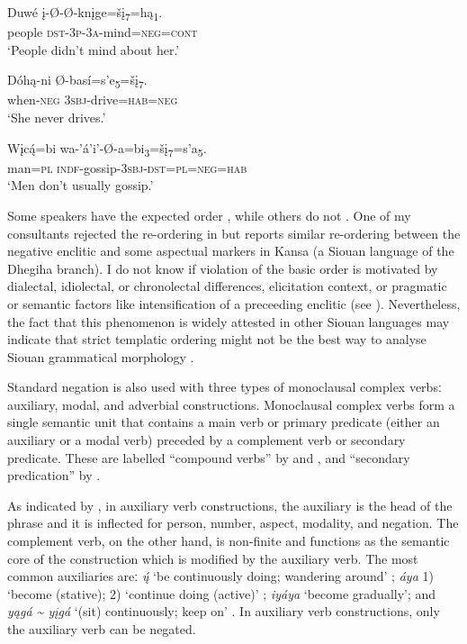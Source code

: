 \documentclass[output=paper,colorlinks,citecolor=brown]{langscibook}
\begin{document}
\ea\label{ex:nak:4}
    \gll Duwé į-Ø-Ø-knįge=šį\textsubscript{7}=hą\textsubscript{1}. \\
         people \textsc{dst-3p-3a}-mind=\textsc{neg=cont} \\
    \glt ‘People didn’t mind about her.’
\z 
 
\ea\label{ex:nak:5}
    \ea\label{ex:nak:5a}
        \gll Dóhą-ni Ø-basí=s’e\textsubscript{5}=šį\textsubscript{7}. \\
             when-\textsc{neg} \textsc{3sbj}-drive=\textsc{hab=neg} \\
        \glt ‘She never drives.’ \citep[320]{Cumberland2005}
    
    \ex\label{ex:nak:5b}
        \gll Wįc\'{ą}=bi wa-’á’i’-Ø-a=bi\textsubscript{3}=šį\textsubscript{7}=s’a\textsubscript{5}. \\
             man=\textsc{pl} \textsc{indf}-gossip-\textsc{3sbj-dst}=\textsc{pl=neg=hab} \\
        \glt ‘Men don’t usually gossip.’
    \z
\z 

Some speakers have the expected order , while others do not . One of my consultants rejected the re-ordering in  but \citet[171--174]{McBride2016} reports similar re-ordering between the negative enclitic and some aspectual markers in Kansa (a Siouan language of the Dhegiha branch). I do not know if violation of the basic order is motivated by dialectal, idiolectal, or chronolectal differences, elicitation context, or pragmatic or semantic factors like intensification of a preceeding enclitic (see ). Nevertheless, the fact that this phenomenon is widely attested in other Siouan languages may indicate that strict templatic ordering might not be the best way to analyse Siouan grammatical morphology \citep[see][186]{RankinEtAl2003}.

Standard negation is also used with three types of monoclausal complex verbsː auxiliary, modal, and adverbial constructions. Monoclausal complex verbs form a single semantic unit that contains a main verb or primary predicate (either an auxiliary or a modal verb) preceded by a complement verb or secondary predicate. These are labelled “compound verbs” by \citet{BoasDeloria1941} and \citet[391--398]{Cumberland2005}, and “secondary predication” by \citet[122]{Ullrich2018}. 

As indicated by \citet[399]{Cumberland2005}, in auxiliary verb constructions, the auxiliary is the head of the phrase and it is inflected for person, number, aspect, modality, and negation. The complement verb, on the other hand, is non-finite and functions as the semantic core of the construction which is modified by the auxiliary verb. The most common auxiliaries areː \textit{\'{ų}} ‘be continuously doing; wandering around’ ; \textit{áya} 1) ‘become (stative); 2) ‘continue doing (active)’ ; \textit{iyáya} ‘become gradually’; and \textit{yągá {\textasciitilde} yįgá} ‘(sit) continuously; keep on’ . In auxiliary verb constructions, only the auxiliary verb can be negated.
\end{document}
